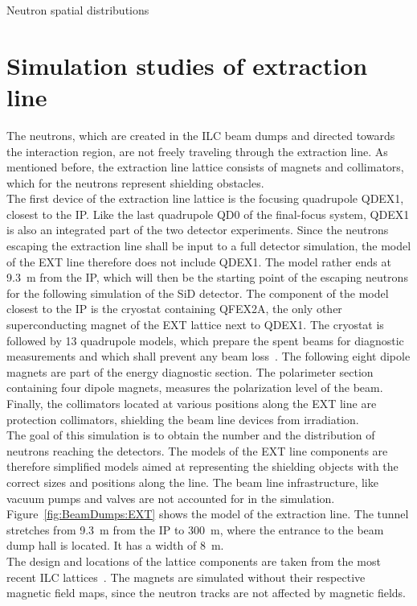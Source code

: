 Neutron spatial distributions

\section{Simulation studies of extraction line}
\label{BeamDumps:sim_EXT}

The neutrons, which are created in the ILC beam dumps and directed towards the interaction region, are not freely traveling through the extraction line.
As mentioned before, the extraction line lattice consists of magnets and collimators, which for the neutrons represent shielding obstacles.
\\The first device of the extraction line lattice is the focusing quadrupole QDEX1, closest to the IP.
Like the last quadrupole QD0 of the final-focus system, QDEX1 is also an integrated part of the two detector experiments.
Since the neutrons escaping the extraction line shall be input to a full detector simulation, the \fluka model of the EXT line therefore does not include QDEX1.
The model rather ends at \SI{9.3}{\meter} from the IP, which will then be the starting point of the escaping neutrons for the following \geant simulation of the SiD detector.
The component of the \fluka model closest to the IP is the cryostat containing QFEX2A, the only other superconducting magnet of the EXT lattice next to QDEX1.
The cryostat is followed by 13 quadrupole models, which prepare the spent beams for diagnostic measurements and which shall prevent any beam loss~\cites[p. 139 ff]{TDR32}{EXT_design, EXT_design2}.
The following eight dipole magnets are part of the energy diagnostic section.
The polarimeter section containing four dipole magnets, measures the polarization level of the beam.
Finally, the collimators located at various positions along the EXT line are protection collimators, shielding the beam line devices from irradiation.
\\The goal of this \fluka simulation is to obtain the number and the distribution of neutrons reaching the detectors.
The models of the EXT line components are therefore simplified models aimed at representing the shielding objects with the correct sizes and positions along the line.
The beam line infrastructure, like vacuum pumps and valves are not accounted for in the simulation.
Figure~\ref{fig:BeamDumps:EXT} shows the \fluka model of the extraction line.
The tunnel stretches from \SI{9.3}{\meter} from the IP to \SI{300}{\meter}, where the entrance to the beam dump hall is located.
It has a width of \SI{8}{\meter}.
\\The design and locations of the lattice components are taken from the most recent ILC lattices~\cite{EXT_lattice,EXT_lattice2}.
The magnets are simulated without their respective magnetic field maps, since the neutron tracks are not affected by magnetic fields.

